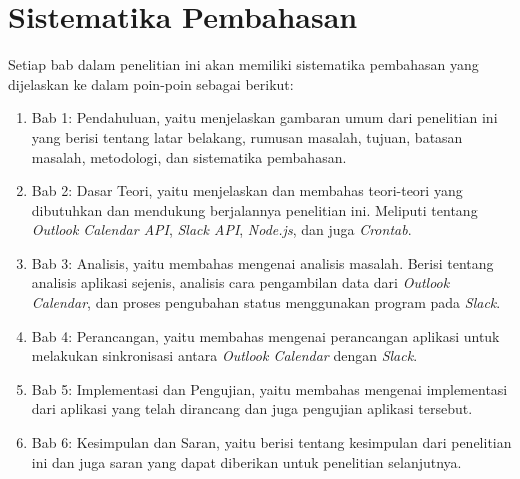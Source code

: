\section{Sistematika Pembahasan}
\label{sec:sispem}
Setiap bab dalam penelitian ini akan memiliki sistematika pembahasan yang dijelaskan ke dalam poin-poin sebagai berikut:
\begin{enumerate}
	\item Bab 1: Pendahuluan, yaitu menjelaskan gambaran umum dari penelitian ini yang berisi tentang latar belakang, rumusan masalah, tujuan, batasan masalah, metodologi, dan sistematika pembahasan.
	\item Bab 2: Dasar Teori, yaitu menjelaskan dan membahas teori-teori yang dibutuhkan dan mendukung berjalannya penelitian ini. Meliputi tentang \textit{Outlook Calendar API}, \textit{Slack API}, \textit{Node.js}, dan juga \textit{Crontab}. 
	\item Bab 3: Analisis, yaitu membahas mengenai analisis masalah. Berisi tentang analisis aplikasi sejenis, analisis cara pengambilan data dari \textit{Outlook Calendar}, dan proses pengubahan status menggunakan program pada \textit{Slack}.
	\item Bab 4: Perancangan, yaitu membahas mengenai perancangan aplikasi untuk melakukan sinkronisasi antara \textit{Outlook Calendar} dengan \textit{Slack}. 
	\item Bab 5: Implementasi dan Pengujian, yaitu membahas mengenai implementasi dari aplikasi yang telah dirancang dan juga pengujian aplikasi tersebut.   
	\item Bab 6: Kesimpulan dan Saran, yaitu berisi tentang kesimpulan dari penelitian ini dan juga saran yang dapat diberikan untuk penelitian selanjutnya.  
\end{enumerate}